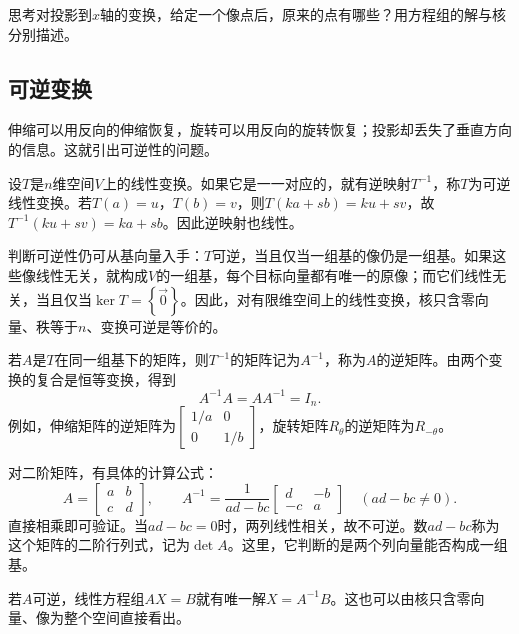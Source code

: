{\kaiti{}思考\quad 对投影到\(x\)轴的变换，给定一个像点后，原来的点有哪些？用方程组的解与核分别描述。}

\subsection{可逆变换}
伸缩可以用反向的伸缩恢复，旋转可以用反向的旋转恢复；投影却丢失了垂直方向的信息。这就引出可逆性的问题。

设\(T\)是\(n\)维空间\(V\)上的线性变换。如果它是一一对应的，就有逆映射\(T^{- 1}\)，称\(T\)为{\heiti{}可逆线性变换}。若\(T \left( a \right) = u\)，\(T \left( b \right) = v\)，则\(T \left( k a + s b \right) = k u + s v\)，故\(T^{- 1} \left( k u + s v \right) = k a + s b\)。因此逆映射也线性。

判断可逆性仍可从基向量入手：\(T\)可逆，当且仅当一组基的像仍是一组基。如果这些像线性无关，就构成\(V\)的一组基，每个目标向量都有唯一的原像；而它们线性无关，当且仅当\(\ker T = \left\{ \vec{0} \right\}\)。因此，对有限维空间上的线性变换，核只含零向量、秩等于\(n\)、变换可逆是等价的。

若\(A\)是\(T\)在同一组基下的矩阵，则\(T^{- 1}\)的矩阵记为\(A^{- 1}\)，称为\(A\)的{\heiti{}逆矩阵}。由两个变换的复合是恒等变换，得到
\begin{equation}
    A^{- 1} A = A A^{- 1} = I_{n} .
\end{equation}
例如，伸缩矩阵的逆矩阵为\(\left[ \begin{matrix}1 / a & 0 \\ 0 & 1 / b\end{matrix} \right]\)，旋转矩阵\(R_{\theta}\)的逆矩阵为\(R_{- \theta}\)。

对二阶矩阵，有具体的计算公式：
\begin{equation}
    A = \left[ \begin{matrix}a & b \\ c & d\end{matrix} \right] ,
    \qquad
    A^{- 1} = \frac{1}{a d - b c} \left[ \begin{matrix}d & - b \\ - c & a\end{matrix} \right]
    \quad \left( a d - b c \ne 0 \right) .
\end{equation}
直接相乘即可验证。当\(a d - b c = 0\)时，两列线性相关，故不可逆。数\(a d - b c\)称为这个矩阵的二阶行列式，记为\(\det A\)。这里，它判断的是两个列向量能否构成一组基。

若\(A\)可逆，线性方程组\(A X = B\)就有唯一解\(X = A^{- 1} B\)。这也可以由核只含零向量、像为整个空间直接看出。

